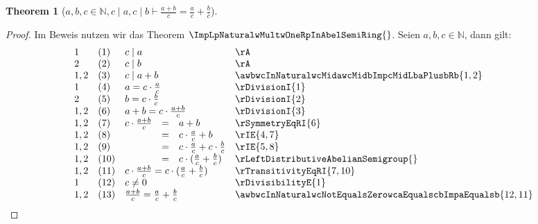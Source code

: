 \documentclass{book}
\theoremstyle{plain}
\newtheorem{theorem}{Theorem}
\theoremstyle{remark}
\theoremstyle{definition}
\begin{document}
\label{aInNaturalwbInNaturalwcInNaturalwcMidawcMidbImpLpaPlusbRpDurchLpcRpEqualsLpaRpDurchLpcRpPlusLpbRpDurchLpcRp}
\begin{theorem}[\(a,b,c\in\mathbb{N}, c\mid a, c\mid b\vdash \frac{a+b}{c}=\frac{a}{c}+\frac{b}{c}\)]
\end{theorem}
\begin{proof}
Im Beweis nutzen wir das Theorem \(\ImpLpNaturalwMultwOneRpInAbelSemiRing{}\). 
Seien \(a,b,c\in\mathbb{N}\), dann gilt:
    \[
	\begin{array}{llclll}
    1       &  (1)  & \multicolumn{3}{l}{c\mid a} & \rA \\
    2       &  (2)  & \multicolumn{3}{l}{c\mid b} & \rA \\
    1,2     &  (3)  & \multicolumn{3}{l}{c\mid a+b} & \awbwcInNaturalwcMidawcMidbImpcMidLbaPlusbRb{1,2} \\
    1       &  (4)  & \multicolumn{3}{l}{a=c\cdot \frac{a}{c}} & \rDivisionI{1}  \\
    2       &  (5)  & \multicolumn{3}{l}{b=c\cdot \frac{b}{c}} & \rDivisionI{2}  \\
    1,2     &  (6)  & \multicolumn{3}{l}{a+b=c\cdot \frac{a+b}{c}} & \rDivisionI{3}  \\
    1,2     &  (7)  & c\cdot \frac{a+b}{c}&=&a+b & \rSymmetryEqRI{6}  \\
    1,2     &  (8)  & &=&c\cdot \frac{a}{c}+b & \rIE{4,7}  \\
    1,2     &  (9)  & &=&c\cdot \frac{a}{c}+c\cdot \frac{b}{c} & \rIE{5,8} \\
    1,2     &  (10)  & &=&c\cdot (\frac{a}{c}+\frac{b}{c}) & \rLeftDistributiveAbelianSemigroup{} \\
    1,2     &  (11)  & \multicolumn{3}{l}{c\cdot \frac{a+b}{c}=c\cdot (\frac{a}{c}+\frac{b}{c})} & \rTransitivityEqRI{7,10} \\
    1       &  (12)  & \multicolumn{3}{l}{c\neq 0} & \rDivisibilityE{1} \\
    1,2     &  (13)  & \multicolumn{3}{l}{\frac{a+b}{c}=\frac{a}{c}+\frac{b}{c}} & \awbwcInNaturalwcNotEqualsZerowcaEqualscbImpaEqualsb{12,11} \\

    \end{array}
	\]
\end{proof}
\end{document}

